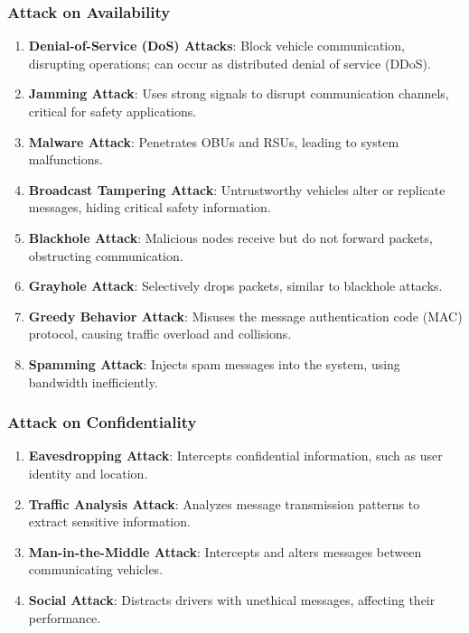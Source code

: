 \subsubsection{Attack on Availability}
\begin{enumerate}
    \item \textbf{Denial-of-Service (DoS) Attacks}: Block vehicle communication, disrupting operations; can occur as distributed denial of service (DDoS).
    \item \textbf{Jamming Attack}: Uses strong signals to disrupt communication channels, critical for safety applications.
    \item \textbf{Malware Attack}: Penetrates OBUs and RSUs, leading to system malfunctions.
    \item \textbf{Broadcast Tampering Attack}: Untrustworthy vehicles alter or replicate messages, hiding critical safety information.
    \item \textbf{Blackhole Attack}: Malicious nodes receive but do not forward packets, obstructing communication.
    \item \textbf{Grayhole Attack}: Selectively drops packets, similar to blackhole attacks.
    \item \textbf{Greedy Behavior Attack}: Misuses the message authentication code (MAC) protocol, causing traffic overload and collisions.
    \item \textbf{Spamming Attack}: Injects spam messages into the system, using bandwidth inefficiently.
\end{enumerate}

\subsubsection{Attack on Confidentiality}
\begin{enumerate}
    \item \textbf{Eavesdropping Attack}: Intercepts confidential information, such as user identity and location.
    \item \textbf{Traffic Analysis Attack}: Analyzes message transmission patterns to extract sensitive information.
    \item \textbf{Man-in-the-Middle Attack}: Intercepts and alters messages between communicating vehicles.
    \item \textbf{Social Attack}: Distracts drivers with unethical messages, affecting their performance.
\end{enumerate}

